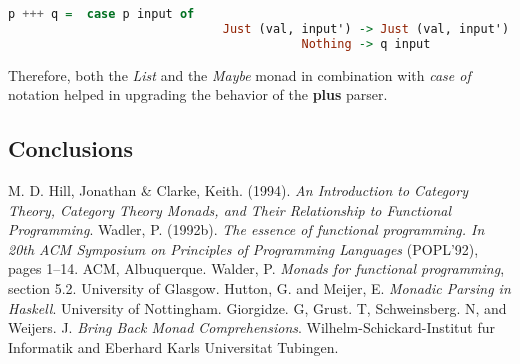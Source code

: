 \documentclass[a4paper, onecolumn]{article}
\begin{document}
     \begin{tcolorbox}
    \begin{lstlisting}[language=Haskell] 
        p +++ q =  case p input of
                              Just (val, input') -> Just (val, input')
                                         Nothing -> q input
    \end{lstlisting}
    \end{tcolorbox}
    
    Therefore, both the \textit{List} and the \textit{Maybe} monad in combination with \textit{case of} notation helped in upgrading the behavior of the \textbf{plus} parser. 
    
    
    \subsection{Conclusions}
    
    
    \begin{thebibliography}{9}
    M. D. Hill, Jonathan & Clarke, Keith. (1994). \textit{An Introduction to Category Theory, Category Theory Monads, and Their Relationship to Functional Programming}.
    Wadler, P. (1992b). \textit{The essence of functional programming. In
    20th ACM Symposium on Principles of Programming Languages}
    (POPL’92), pages 1–14. ACM, Albuquerque.
    Walder, P. \textit{Monads for functional programming}, section 5.2. University of Glasgow. 
    Hutton, G. and Meijer, E. \textit{Monadic Parsing in Haskell}. University of Nottingham.
    Giorgidze. G, Grust. T, Schweinsberg. N, and Weijers. J. \textit{Bring Back Monad Comprehensions}. Wilhelm-Schickard-Institut fur Informatik and Eberhard Karls Universitat Tubingen.
    \end{thebibliography}
    
\end{document}
